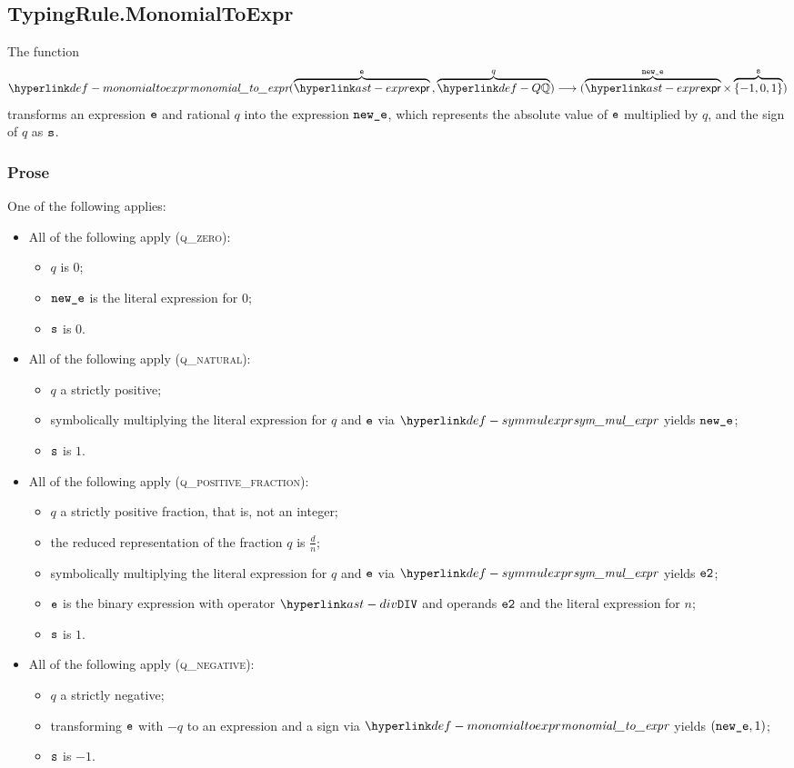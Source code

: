 \subsection{TypingRule.MonomialToExpr \label{sec:TypingRule.MonomialToExpr}}
\hypertarget{def-monomialtoexpr}{}
The function
\[
\monomialtoexpr(\overname{\expr}{\ve} \aslsep \overname{\Q}{q})
\aslto (\overname{\expr}{\newe} \times \overname{\{-1,0,1\}}{\vs})
\]
transforms an expression $\texttt{e}$ and rational $q$ into the expression $\texttt{new\_e}$,
which represents the absolute value of $\texttt{e}$ multiplied by $q$, and the sign of $q$ as $\texttt{s}$.

\subsubsection{Prose}
One of the following applies:
\begin{itemize}
  \item All of the following apply (\textsc{q\_zero}):
  \begin{itemize}
    \item $q$ is $0$;
    \item $\texttt{new\_e}$ is the literal expression for $0$;
    \item $\texttt{s}$ is $0$.
  \end{itemize}

  \item All of the following apply (\textsc{q\_natural}):
  \begin{itemize}
    \item $q$ a strictly positive;
    \item symbolically multiplying the literal expression for $q$ and $\texttt{e}$ via $\symmulexpr$ yields $\texttt{new\_e}$;
    \item $\texttt{s}$ is $1$.
  \end{itemize}

  \item All of the following apply (\textsc{q\_positive\_fraction}):
  \begin{itemize}
    \item $q$ a strictly positive fraction, that is, not an integer;
    \item the reduced representation of the fraction $q$ is $\frac{d}{n}$;
    \item symbolically multiplying the literal expression for $q$ and $\texttt{e}$ via $\symmulexpr$ yields $\texttt{e2}$;
    \item $\texttt{e}$ is the binary expression with operator $\DIV$ and operands $\texttt{e2}$ and the literal expression for $n$;
    \item $\texttt{s}$ is $1$.
  \end{itemize}

  \item All of the following apply (\textsc{q\_negative}):
  \begin{itemize}
    \item $q$ a strictly negative;
    \item transforming $\texttt{e}$ with $-q$ to an expression and a sign via $\monomialtoexpr$ yields $(\texttt{new\_e}, 1)$;
    \item $\texttt{s}$ is $-1$.
  \end{itemize}
\end{itemize}

